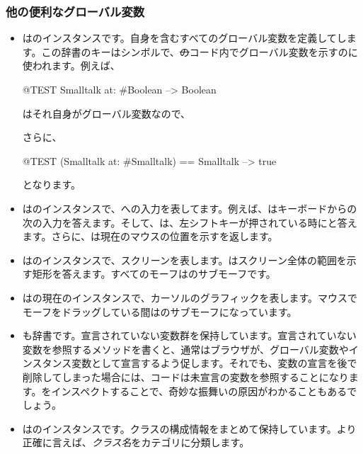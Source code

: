 \documentclass[a4paper,10pt,twoside]{book}
\begin{document}
\subsubsection{他の便利なグローバル変数}

\begin{itemize}
\item
{}はのインスタンスです。自身を含むすべてのグローバル変数を定義してします。この辞書のキーはシンボルで、\st のコード内でグローバル変数を示すのに使われます。例えば、
\begin{code}{@TEST}
Smalltalk at: #Boolean --> Boolean
\end{code}
はそれ自身がグローバル変数なので、
\begin{code}{}
Smalltalk at: #Smalltalk-->a SystemDictionary(lots of globals)}
\end{code} 
さらに、
\begin{code}{@TEST}
(Smalltalk at: #Smalltalk) == Smalltalk --> true
\end{code}
となります。

\item {}はのインスタンスで、\pharo への入力を表してます。例えば、はキーボードからの次の入力を答えます。そして、は、左シフトキーが押されている時にと答えます。さらに、は現在のマウスの位置を示すを返します。


\item {}はのインスタンスで、スクリーンを表します。はスクリーン全体の範囲を示す矩形を答えます。すべてのモーフはのサブモーフです。

\item 
{}はの現在のインスタンスで、カーソルのグラフィックを表します。マウスでモーフをドラッグしている間はのサブモーフになっています。

\item
{}も辞書です。宣言されていない変数群を保持しています。宣言されていない変数を参照するメソッドを書くと、通常はブラウザが、グローバル変数やインスタンス変数として宣言するよう促します。それでも、変数の宣言を後で削除してしまった場合には、コードは未宣言の変数を参照することになります。をインスペクトすることで、奇妙な振舞いの原因がわかることもあるでしょう。

\item
{}はのインスタンスです。クラスの構成情報をまとめて保持しています。より正確に言えば、\emph{クラス名}をカテゴリに分類します。
\end{itemize}
\end{document}
